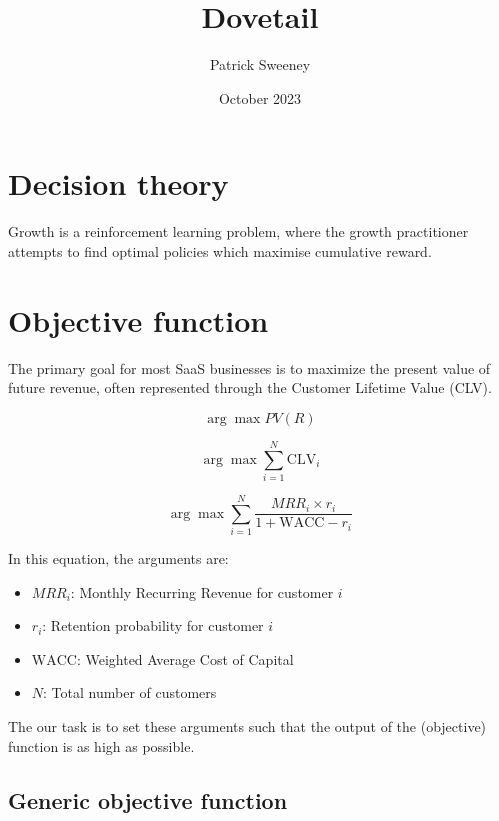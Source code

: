 \documentclass{article}
\title{Dovetail}
\author{Patrick Sweeney}
\date{October 2023}
\begin{document}
\maketitle

\section{Decision theory}

Growth is a reinforcement learning problem, where the growth practitioner attempts to find optimal policies which maximise cumulative reward.






\section{Objective function}
The primary goal for most SaaS businesses is to maximize the present value of future revenue, often represented through the Customer Lifetime Value (CLV).

\begin{equation}
\arg\max PV(R) 
\end{equation}


\begin{equation}
\arg\max  \sum_{i=1}^{N} \text{CLV}_i 
\end{equation}

\begin{equation}
\arg\max  \sum_{i=1}^{N} \frac{MRR_i \times r_i}{1 + \text{WACC} - r_i}
\end{equation}



In this equation, the arguments are:
\begin{itemize}
  \item \( MRR_i \): Monthly Recurring Revenue for customer \(i\)
  \item \( r_i \): Retention probability for customer \(i\)
  \item \(\text{WACC}\): Weighted Average Cost of Capital
\item \( N \): Total number of customers
\end{itemize}

The our task is to set these arguments such that the output of the (objective) function is as high as possible.



\subsection{Generic objective function}
\end{document}
